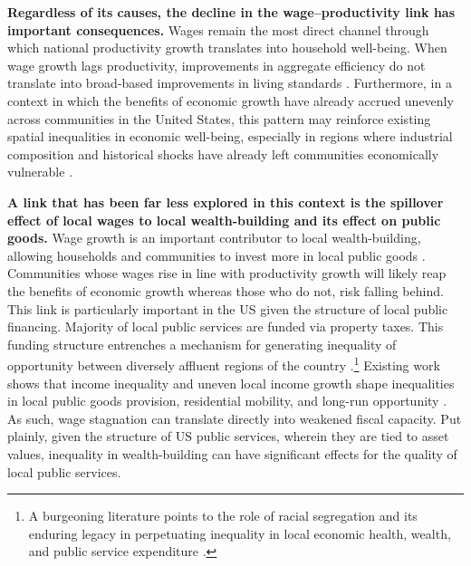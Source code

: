 \documentclass[
  10pt,
]{article}
\begin{document}
\textbf{Regardless of its causes, the decline in the wage–productivity link has important consequences.}
Wages remain the most direct channel through which national productivity
growth translates into household well-being. When wage growth lags
productivity, improvements in aggregate efficiency do not translate into
broad-based improvements in living standards \autocite{mishel2021}.
Furthermore, in a context in which the benefits of economic growth have
already accrued unevenly across communities in the United States, this
pattern may reinforce existing spatial inequalities in economic
well-being, especially in regions where industrial composition and
historical shocks have already left communities economically vulnerable
\autocite{bauluz,rickard2020,fee2025,storper2009,fallah2011,benmelech,greenstone2010}.

\textbf{A link that has been far less explored in this context is the
spillover effect of local wages to local wealth-building and its effect
on public goods.} Wage growth is an important contributor to local
wealth-building, allowing households and communities to invest more in
local public goods \autocite{boustan2013}. Communities whose wages rise
in line with productivity growth will likely reap the benefits of
economic growth whereas those who do not, risk falling behind. This link
is particularly important in the US given the structure of local public
financing. Majority of local public services are funded via property
taxes. This funding structure entrenches a mechanism for generating
inequality of opportunity between diversely affluent regions of the
country
\autocite{manduca2025,weir2021,schechtl2024,mettler2011}.\footnote{A
  burgeoning literature points to the role of racial segregation and its
  enduring legacy in perpetuating inequality in local economic health,
  wealth, and public service expenditure
  \autocite{avenancio-león2022,trounstine2016,trounstine2021}.} Existing
work shows that income inequality and uneven local income growth shape
inequalities in local public goods provision, residential mobility, and
long-run opportunity \autocite{chetty2014}. As such, wage stagnation can
translate directly into weakened fiscal capacity. Put plainly, given the
structure of US public services, wherein they are tied to asset values,
inequality in wealth-building can have significant effects for the
quality of local public services.
\end{document}
